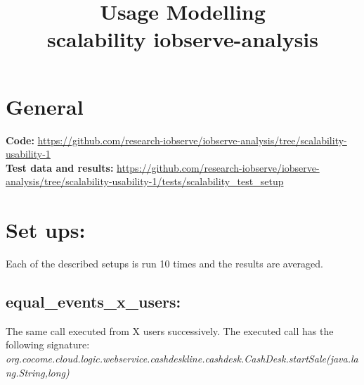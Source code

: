 \documentclass[10pt,a4paper]{article}
\begin{document}
\title{Usage Modelling\\scalability iobserve-analysis}
\date{}
\maketitle

\section{General}
\textbf{Code:} \url{https://github.com/research-iobserve/iobserve-analysis/tree/scalability-usability-1}\\
\textbf{Test data and results:} \url{https://github.com/research-iobserve/iobserve-analysis/tree/scalability-usability-1/tests/scalability_test_setup}

\section{Set ups:}
Each of the described setups is run 10 times and the results are averaged.

\subsection{equal\_events\_x\_users:}
The same call executed from X users successively. The executed call has the following signature:\\ \emph{org.cocome.cloud.logic.webservice.cashdeskline.cashdesk.CashDesk.startSale(java.lang.String,long)}
\end{document}
